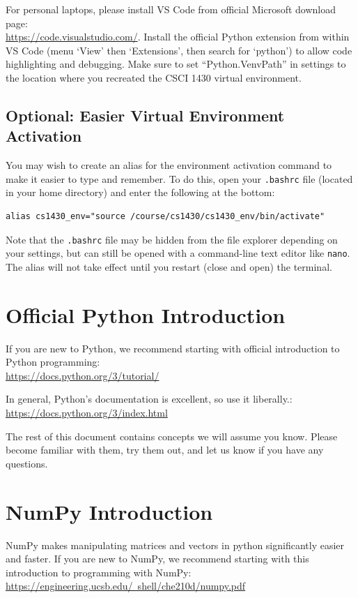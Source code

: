 \documentclass{article}
\begin{document}
For personal laptops, please install VS Code from official Microsoft download page:\\ \href{https://code.visualstudio.com/}{https://code.visualstudio.com/}. Install the official Python extension from within VS Code (menu `View' then `Extensions', then search for `python') to allow code highlighting and debugging. Make sure to set ``Python.VenvPath'' in settings to the location where you recreated the CSCI 1430 virtual environment.


\subsection{Optional: Easier Virtual Environment Activation}
\label{sec:venvactivation}

You may wish to create an alias for the environment activation command to make it easier to type and remember. To do this, open your \texttt{.bashrc} file (located in your home directory) and enter the following at the bottom:
\begin{verbatim}
alias cs1430_env="source /course/cs1430/cs1430_env/bin/activate"
\end{verbatim}

Note that the \texttt{.bashrc} file may be hidden from the file explorer depending on your settings, but can still be opened with a command-line text editor like \texttt{nano}. The alias will not take effect until you restart (close and open) the terminal.

\section{Official Python Introduction}
If you are new to Python, we recommend starting with official introduction to Python programming:\\
\href{https://docs.python.org/3/tutorial/}{https://docs.python.org/3/tutorial/}

In general, Python's documentation is excellent, so use it liberally.:\\
\href{https://docs.python.org/3/index.html}{https://docs.python.org/3/index.html}

The rest of this document contains concepts we will assume you know. Please become familiar with them, try them out, and let us know if you have any questions.


\section{NumPy Introduction}
NumPy makes manipulating matrices and vectors in python significantly easier and faster.
If you are new to NumPy, we recommend starting with this introduction to programming with NumPy:\\
\href{https://engineering.ucsb.edu/~shell/che210d/numpy.pdf}{https://engineering.ucsb.edu/~shell/che210d/numpy.pdf}
\end{document}
